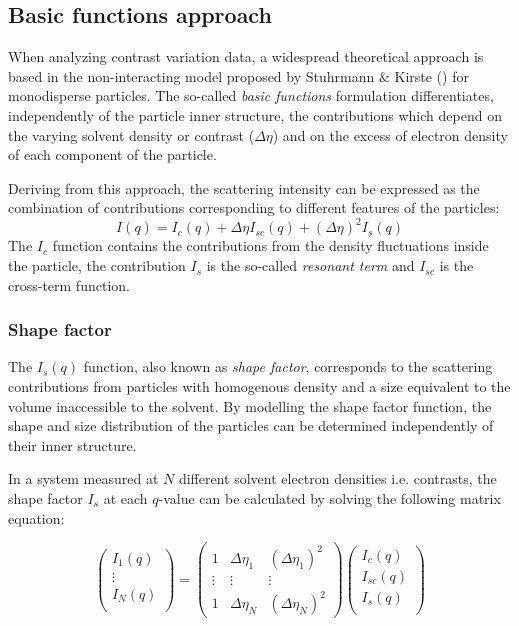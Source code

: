 \subsection{Basic functions approach}
\label{sec:basic_functions_theory}
When analyzing contrast variation data, a widespread theoretical approach is based in the non-interacting model proposed by Stuhrmann $\&$ Kirste (\citeyear{stuhrmann_elimination_1965,stuhrmann_elimination_1967}) for monodisperse particles. The so-called \emph{basic functions} formulation differentiates, independently of the particle inner structure, the contributions which depend on the varying solvent density or contrast (\(\Delta\eta\)) and on the excess of electron density of each component of the particle. 

Deriving from this approach, the scattering intensity can be expressed as the combination of contributions corresponding to different features of the particles:
\begin{equation}
\label{eq:intensity_contrast}
I(q)=I_c(q)+\Delta\eta I_{sc}(q)+(\Delta\eta)^2 I_{s}(q)
\end{equation}
The $I_c$ function contains the contributions from the density fluctuations inside the particle, the contribution $I_s$ is the so-called \emph{resonant term} and $I_{sc}$ is the cross-term function.


\subsubsection{Shape factor}
The $I_s(q)$ function, also known as \emph{shape factor}, corresponds to the scattering contributions from particles with homogenous density and a size equivalent to the volume inaccessible to the solvent. By modelling the shape factor function, the shape and size distribution of the particles can be determined independently of their inner structure.

In a system measured at $N$ different solvent electron densities i.e. contrasts, the shape factor $I_s$ at each $q$-value can be calculated by solving the following matrix equation:

\begin{equation}
  \begin{pmatrix}
  I_1(q) \\
  \vdots \\
  I_N(q) \\
 \end{pmatrix}
  = 
 \begin{pmatrix}
  1 & \Delta \eta_1 &  \left( \Delta \eta_1 \right)^2 \\
  \vdots  & \vdots  & \vdots  \\
  1 & \Delta \eta_N &  \left( \Delta \eta_N \right)^2 
 \end{pmatrix}
 \begin{pmatrix}
  I_c(q) \\
  I_{sc}(q) \\
  I_s(q) \\
 \end{pmatrix}
\end{equation}


